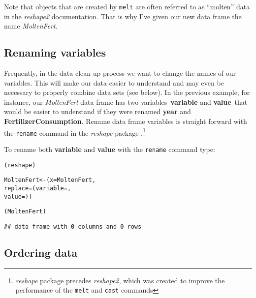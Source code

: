 \noindent Note that objects that are created by \texttt{melt} are often referred to as ``molten'' data in the \emph{reshape2} documentation. That is why I've given our new data frame the name \emph{MoltenFert}. 

\subsection{Renaming variables}

Frequently, in the data clean up process we want to change the names of our variables. This will make our data easier to understand and may even be necessary to properly combine data sets (see below). In the previous example, for instance, our \emph{MoltenFert} data frame has two variables--\textbf{variable} and \textbf{value}--that would be easier to understand if they were renamed \textbf{year} and \textbf{FertilizerConsumption}. Rename data frame variables is straight forward with the \texttt{rename} command in the \emph{reshape} package \citep{R-reshape}.\footnote{\emph{reshape} package precedes \emph{reshape2}, which was created to improve the performance of the \texttt{melt} and \texttt{cast} commands}

To rename both \textbf{variable} and \textbf{value} with the \texttt{rename} command type:

\begin{knitrout}
\color{fgcolor}\begin{kframe}
\begin{alltt}
(reshape)

MoltenFert <- (x = MoltenFert,
                     replace = (variable = ,
                                 value = ))

(MoltenFert)
\end{alltt}
\begin{verbatim}
## data frame with 0 columns and 0 rows
\end{verbatim}
\end{kframe}
\end{knitrout}


\subsection{Ordering data}

